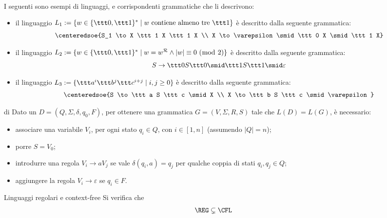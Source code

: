 \documentclass[a4paper, 12pt]{report}
\begin{document}
    \begin{example}
        I seguenti sono esempi di linguaggi, e corrispondenti grammatiche che li descrivono:

        \begin{itemize}
            \item il linguaggio $L_1 := \{w \in \{\ttt 0, \ttt 1\}^* \mid w \ \mathrm{contiene \ almeno \ tre \ \ttt 1}\}$ è descritto dalla seguente grammatica: $$\centeredsoe{S_1 \to X \ttt 1 X \ttt 1 X \\ X \to \varepsilon \smid \ttt 0 X \smid \ttt 1 X}$$
            \item il linguaggio $L_2 := \{w \in \{\ttt 0, \ttt 1\}^* \mid w = w ^\mathcal{R} \land |w| \equiv 0 \ (\bmod \ 2)\}$ è descritto dalla seguente grammatica: $$S \to \ttt 0 S \ttt 0 \smid \ttt 1 S \ttt 1 \smid \varepsilon$$
            \item il linguaggio $L_3 := \{\ttt a^i \ttt b^j \ttt c^{i + j} \mid i, j \ge 0\}$ è descritto dalla seguente grammatica: $$\centeredsoe{S \to \ttt a S \ttt c \smid X \\ X \to \ttt b S \ttt c \smid \varepsilon}$$
        \end{itemize}
    \end{example}

    \begin{framedmeth}[label={dfa into cfg}]{\CFG di \DFA}
        Dato un \DFA $D = (Q, \Sigma, \delta, q_0, F)$, per ottenere una grammatica $G = (V, \Sigma, R, S)$ tale che $L(D) = L(G)$, è necessario:

        \begin{itemize}
            \item associare una variabile $V_i$, per ogni stato $q_i \in Q$, con $i \in [1, n]$ (assumendo $|Q| = n$);
            \item porre $S = V_0$;
            \item introdurre una regola $V_i \to a V_j$ se vale $\delta(q_i, a) = q_j$ per qualche coppia di stati $q_i, q_j \in Q$;
            \item aggiungere la regola $V_i \to \varepsilon$ se $q_i \in F$.
        \end{itemize}
    \end{framedmeth}

    \begin{framedcor}[label={reg subset cfl}]{Linguaggi regolari e context-free}
        Si verifica che $$\REG \subsetneq \CFL$$
    \end{framedcor}
\end{document}
